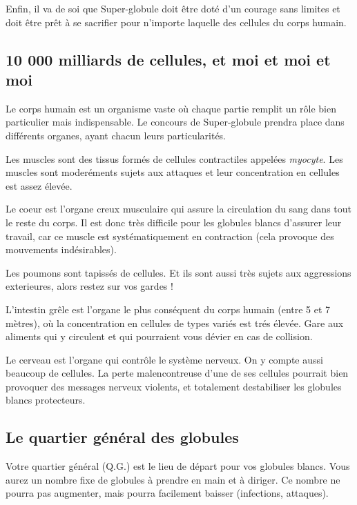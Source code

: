 \documentclass[a4paper,twoside,12pt]{article}
\begin{document}
Enfin, il va de soi  que Super-globule doit \^etre dot\'e d'un courage
sans limites  et doit  \^etre pr\^et \`a  se sacrifier  pour n'importe
laquelle des cellules du corps humain.

\subsection{10 000 milliards de cellules, et moi et moi et moi}

Le corps humain  est un organisme vaste o\`u  chaque partie remplit un
r\^ole   bien   particulier  mais   indispensable.   Le  concours   de
Super-globule  prendra place dans  diff\'erents organes,  ayant chacun
leurs particularit\'es.

Les  muscles  sont  des   tissus  form\'es  de  cellules  contractiles
appel\'ees \emph{myocyte}.  Les muscles sont  moder\'ements sujets aux
attaques et leur concentration en cellules est assez \'elev\'ee.

Le coeur  est l'organe creux  musculaire qui assure la  circulation du
sang dans  tout le reste du  corps. Il est donc  tr\`es difficile pour
les  globules  blancs  d'assurer  leur  travail,  car  ce  muscle  est
syst\'ematiquement  en  contraction   (cela  provoque  des  mouvements
ind\'esirables).

Les  poumons sont  tapiss\'es de  cellules. Et  ils sont  aussi tr\`es
sujets aux aggressions exterieures, alors restez sur vos gardes !

L'intestin gr\^ele  est l'organe le plus cons\'equent  du corps humain
(entre 5  et 7 m\`etres), o\`u  la concentration en  cellules de types
vari\'es est tr\'es  \'elev\'ee. Gare aux aliments qui  y circulent et
qui pourraient vous d\'evier en cas de collision.

Le  cerveau est  l'organe qui  contr\^ole le  syst\`eme nerveux.  On y
compte aussi  beaucoup de cellules.  La perte malencontreuse  d'une de
ses cellules pourrait bien provoquer des messages nerveux violents, et
totalement destabiliser les globules blancs protecteurs.

\subsection{Le quartier g\'en\'eral des globules}

Votre quartier  g\'en\'eral (Q.G.)  est  le lieu de d\'epart  pour vos
globules blancs. Vous aurez un  nombre fixe de globules \`a prendre en
main et  \`a diriger. Ce nombre  ne pourra pas  augmenter, mais pourra
facilement baisser (infections, attaques).
\end{document}
